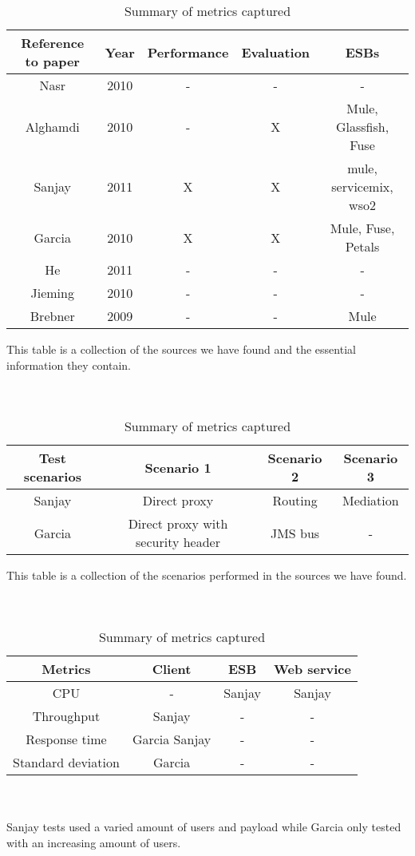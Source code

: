 \begin{table}[H]
	\caption{Summary of academic papers and what test they perform}
	\begin{tabular}{c c c c c}

		Reference to paper & Year & Performance & Evaluation & ESBs \\ 
		\hline
		Nasr \cite{Nasr2010} & 2010 & - & - & - \\ 
		Alghamdi \cite{Alghamdi2010} & 2010 & - & X & Mule, Glassfish, Fuse\\
		Sanjay \cite{Sanjay2011} & 2011 & X & X & mule, servicemix, wso2 \\ 
		Garcia \cite{Garcia2010} & 2010 & X & X & Mule, Fuse, Petals \\
		He \cite{HeIntegration} & 2011 & - & - & -\\
		Jieming \cite{Jieming2010} & 2010 & - & - & - \\
		Brebner \cite{Brebner2009} & 2009 & - & - & Mule \\
		\hline
	\end{tabular}
	This table is a collection of the sources we have found and the essential information they contain.
	\\ 
	\\
	\\
	\caption{Summary of the scenarios in the academic performance tests}
	\begin{tabular}{c c c c}

		Test scenarios & Scenario 1 & Scenario 2 & Scenario 3 \\
		\hline
		Sanjay \cite{Sanjay2011} & Direct proxy & Routing & Mediation \\ 

		Garcia \cite{Garcia2010} & Direct proxy with security header & JMS bus & - \\ 
		\hline
	\end{tabular}
	This table is a collection of the scenarios performed in the sources we have found.
	\\
	\\
	\\
	\caption{Summary of metrics captured}
	\begin{tabular}{c c c c}
	Metrics &  Client & ESB & Web service \\
	\hline
	CPU & - & Sanjay \cite{Sanjay2011} & Sanjay \cite{Sanjay2011}\\
	Throughput & Sanjay \cite{Sanjay2011} & - & - \\
	Response time & Garcia \cite{Garcia2010} Sanjay \cite{Sanjay2011} & - & - \\
	Standard deviation & Garcia \cite{Garcia2010} & - & - \\
	\hline
	\end{tabular}
	\\
	\\
	Sanjay \cite{Sanjay2011} tests used a varied amount of users and payload while Garcia \cite{Garcia2010} only tested with an increasing amount of users.
\end{table}

